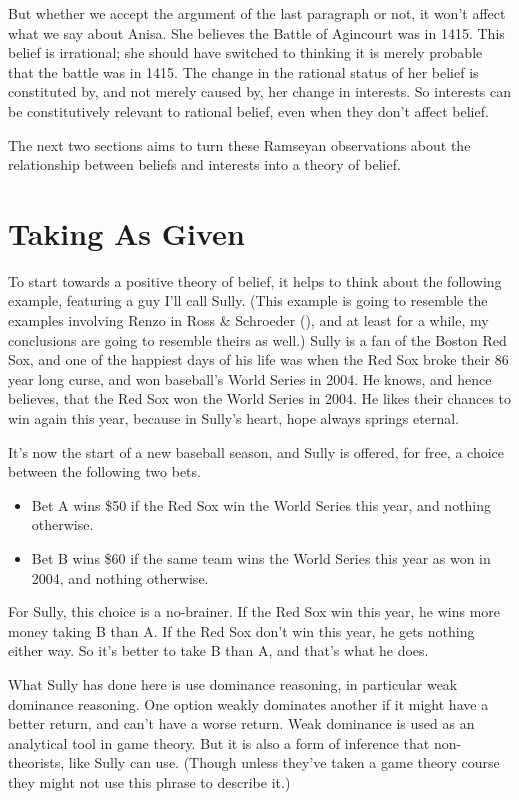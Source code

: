 \documentclass[
  12pt,
  letterpaper,
]{scrbook}
\providecommand{\tightlist}{%
  \setlength{\itemsep}{0pt}\setlength{\parskip}{0pt}}\usepackage{longtable,booktabs,array}
\begin{document}
But whether we accept the argument of the last paragraph or not, it
won't affect what we say about Anisa. She believes the Battle of
Agincourt was in 1415. This belief is irrational; she should have
switched to thinking it is merely probable that the battle was in 1415.
The change in the rational status of her belief is constituted by, and
not merely caused by, her change in interests. So interests can be
constitutively relevant to rational belief, even when they don't affect
belief.

The next two sections aims to turn these Ramseyan observations about the
relationship between beliefs and interests into a theory of belief.

\section{Taking As Given}\label{sec-given}

To start towards a positive theory of belief, it helps to think about
the following example, featuring a guy I'll call Sully. (This example is
going to resemble the examples involving Renzo in Ross \& Schroeder
(), and at least for a while, my
conclusions are going to resemble theirs as well.) Sully is a fan of the
Boston Red Sox, and one of the happiest days of his life was when the
Red Sox broke their 86 year long curse, and won baseball's World Series
in 2004. He knows, and hence believes, that the Red Sox won the World
Series in 2004. He likes their chances to win again this year, because
in Sully's heart, hope always springs eternal.

It's now the start of a new baseball season, and Sully is offered, for
free, a choice between the following two bets.

\begin{itemize}
\tightlist
\item
  Bet A wins \$50 if the Red Sox win the World Series this year, and
  nothing otherwise.
\item
  Bet B wins \$60 if the same team wins the World Series this year as
  won in 2004, and nothing otherwise.
\end{itemize}

For Sully, this choice is a no-brainer. If the Red Sox win this year, he
wins more money taking B than A. If the Red Sox don't win this year, he
gets nothing either way. So it's better to take B than A, and that's
what he does.

What Sully has done here is use dominance reasoning, in particular weak
dominance reasoning. One option weakly dominates another if it might
have a better return, and can't have a worse return. Weak dominance is
used as an analytical tool in game theory. But it is also a form of
inference that non-theorists, like Sully can use. (Though unless they've
taken a game theory course they might not use this phrase to describe
it.)
\end{document}
